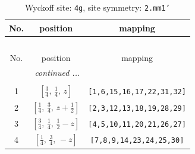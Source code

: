 \documentclass[fleqn,8pt]{jsarticle}
\begin{document}
\renewcommand{\arraystretch}{1.2}
\begin{longtable}{ccc}
\caption{Wyckoff site: {\tt 4g}, site symmetry: {\tt 2.mm1'}}
 \\
 \hline \hline
No. & position & mapping \\ \hline \endfirsthead

\multicolumn{2}{l}{\tablename\ \thetable{}} \\
 \hline \hline
No. & position & mapping \\ \hline \endhead

 \hline \hline
\multicolumn{2}{r}{\footnotesize\it continued ...} \\ \endfoot

 \hline \hline
\multicolumn{2}{r}{} \\ \endlastfoot

1 & $\left[ \frac{3}{4},\, \frac{1}{4},\, z \right]$ & {\tt [1,6,15,16,17,22,31,32]} \\ \hline
2 & $\left[ \frac{1}{4},\, \frac{3}{4},\, z + \frac{1}{2} \right]$ & {\tt [2,3,12,13,18,19,28,29]} \\ \hline
3 & $\left[ \frac{3}{4},\, \frac{1}{4},\, \frac{1}{2} - z \right]$ & {\tt [4,5,10,11,20,21,26,27]} \\ \hline
4 & $\left[ \frac{1}{4},\, \frac{3}{4},\, - z \right]$ & {\tt [7,8,9,14,23,24,25,30]} \\
\end{longtable}
\renewcommand{\arraystretch}{1.2}
\end{document}
